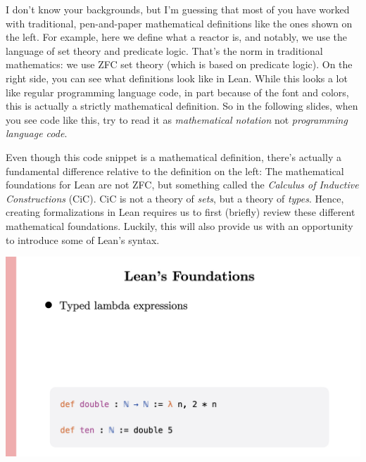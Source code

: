 \documentclass{article}
\begin{document}
I don't know your backgrounds, but I'm guessing that most of you have
worked with traditional, pen-and-paper mathematical definitions like the
ones shown on the left. For example, here we define what a reactor is,
and notably, we use the language of set theory and predicate logic.
That's the norm in traditional mathematics: we use ZFC set theory (which
is based on predicate logic). On the right side, you can see what
definitions look like in Lean. While this looks a lot like regular
programming language code, in part because of the font and colors, this
is actually a strictly mathematical definition. So in the following
slides, when you see code like this, try to read it as
\emph{mathematical notation} not \emph{programming language code}.

Even though this code snippet is a mathematical definition, there's
actually a fundamental difference relative to the definition on the
left: The mathematical foundations for Lean are not ZFC, but something
called the \emph{Calculus of Inductive Constructions} (CiC). CiC is not
a theory of \emph{sets}, but a theory of \emph{types}. Hence, creating
formalizations in Lean requires us to first (briefly) review these
different mathematical foundations. Luckily, this will also provide us
with an opportunity to introduce some of Lean's syntax.

\begin{center}
  \includegraphics[width=\columnwidth]{Slides/Slide 4.jpeg}
\end{center}
\end{document}
